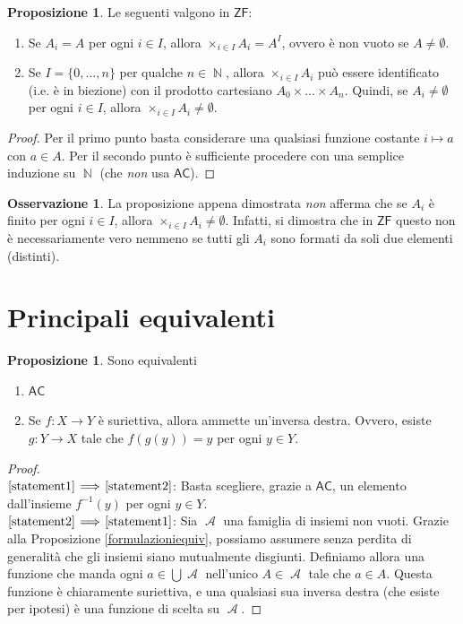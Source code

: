 \documentclass[12pt,a4paper]{report}
\theoremstyle{definition}
\newtheorem{oss}[teo]{Osservazione}  %
\newtheorem{prop}[teo]{Proposizione}  %
\theoremstyle{num.custom-title}
\DeclareMathOperator{\A}{\mathcal{A}}
\DeclareMathOperator{\N}{\mathbb{N}}
\newcommand{\AC}{\ensuremath{\mathsf{AC}}\xspace}
\newcommand{\ZF}{\ensuremath{\mathsf{ZF}}\xspace}
\newcommand{\Implies}[2]{$\text{\ref{statement#1}}\!\implies\!\text{\ref{statement#2}}$}%
\newcommand{\punto}[1]{\item \label{statement#1}}
\newenvironment{equivalence}
    {\begin{enumerate}[label=(\arabic*),ref=(\arabic*)]
    }
    { 
	\end{enumerate}
    }
\begin{document}
\begin{prop} Le seguenti valgono in \ZF:

\begin{enumerate}
\item Se $A_i = A$ per ogni $i \in I$, allora $\times_{i \in I} A_i = A^I$, ovvero è non vuoto se $A \neq \emptyset$.
\item Se $I=\{0,...,n\}$ per qualche $n \in \N$, allora $\times_{i \in I} A_i$ può essere identificato (i.e. è in biezione) con il prodotto cartesiano $A_0 \times ... \times A_n$. Quindi, se $A_i \neq \emptyset$ per ogni $i \in I$, allora $\times_{i \in I} A_i \neq \emptyset$.
\end{enumerate}

\begin{proof}
Per il primo punto basta considerare una qualsiasi funzione costante $i \mapsto a$ con $a \in A$. Per il secondo punto è sufficiente procedere con una semplice induzione su $\N$ (che \emph{non} usa \AC).
\end{proof}
\end{prop}

\begin{oss}
La proposizione appena dimostrata \emph{non} afferma che se $A_i$ è finito per ogni $i \in I$, allora $\times_{i \in I} A_i \neq \emptyset$. Infatti, si dimostra che in \ZF questo non è necessariamente vero nemmeno se tutti gli $A_i$ sono formati da soli due elementi (distinti). 
\end{oss}


\section{Principali equivalenti}


\begin{prop}
Sono equivalenti
\begin{equivalence}
\punto{1} \AC
\punto{2} Se $f : X \to Y$ è suriettiva, allora ammette un'inversa destra. Ovvero, esiste $g: Y \to X$ tale che $f(g(y))=y$ per ogni $y \in Y$.
\end{equivalence}
\begin{proof}\ \\
\Implies{1}{2}: Basta scegliere, grazie a \AC, un elemento dall'insieme $f^{-1}(y)$ per ogni $y \in Y$.\\
\Implies{2}{1}: Sia $\A$ una famiglia di insiemi non vuoti. Grazie alla Proposizione \ref{formulazioniequiv}, possiamo assumere senza perdita di generalità che gli insiemi siano mutualmente disgiunti. Definiamo allora una funzione che manda ogni $a \in \bigcup\A$ nell'unico $A \in \A$ tale che $a \in A$. Questa funzione è chiaramente suriettiva, e una qualsiasi sua inversa destra (che esiste per ipotesi) è una funzione di scelta su $\A$.
\end{proof}
\end{prop}
\end{document}
